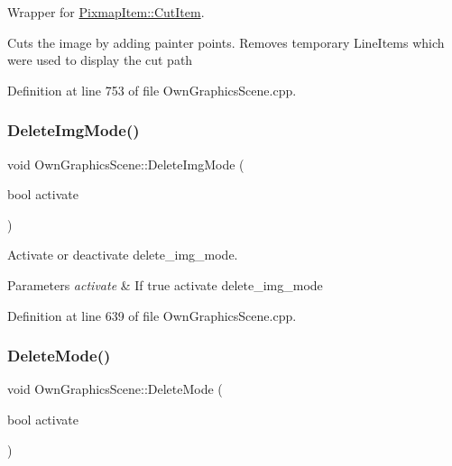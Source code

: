 Wrapper for \mbox{\hyperlink{classPixmapItem_a4a742318dce01d018da2f4b01790c210}{Pixmap\+Item\+::\+Cut\+Item}}. 

Cuts the image by adding painter points. Removes temporary Line\+Items which were used to display the cut path 

Definition at line 753 of file Own\+Graphics\+Scene.\+cpp.

\mbox{\label{classOwnGraphicsScene_aefe52a5b20dbb38dcc9d9510ecfabe52}} 
\subsubsection{\texorpdfstring{Delete\+Img\+Mode()}{DeleteImgMode()}}
{\footnotesize\ttfamily void Own\+Graphics\+Scene\+::\+Delete\+Img\+Mode (\begin{DoxyParamCaption}\item[{bool}]{activate }\end{DoxyParamCaption})}



Activate or deactivate delete\+\_\+img\+\_\+mode. 


\begin{DoxyParams}{Parameters}
{\em activate} & If true activate delete\+\_\+img\+\_\+mode \\
\hline
\end{DoxyParams}


Definition at line 639 of file Own\+Graphics\+Scene.\+cpp.

\mbox{\label{classOwnGraphicsScene_aca454942ecf6c472d020e063862464d4}} 
\subsubsection{\texorpdfstring{Delete\+Mode()}{DeleteMode()}}
{\footnotesize\ttfamily void Own\+Graphics\+Scene\+::\+Delete\+Mode (\begin{DoxyParamCaption}\item[{bool}]{activate }\end{DoxyParamCaption})}



